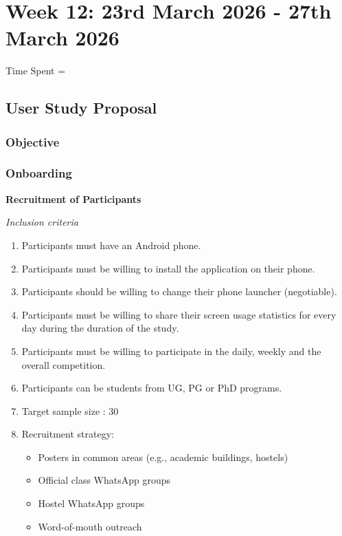 \documentclass{article}
\begin{document}
\newpage
\section{Week 12: 23rd March 2026 - 27th March 2026}
Time Spent =

\subsection{User Study Proposal}
\subsubsection{Objective}

\textbf{}

\subsubsection{Onboarding}

\textbf{Recruitment of Participants}

\textit{Inclusion criteria}
\begin{enumerate}
    \item Participants must have an Android phone.
    \item Participants must be willing to install the application on their phone.
    \item Participants should be willing to change their phone launcher (negotiable).
    \item Participants must be willing to share their screen usage statistics for every day during the duration of the study.
    \item Participants must be willing to participate in the daily, weekly and the overall competition.
    \item Participants can be students from UG, PG or PhD programs.
    \item Target sample size : 30
    \item Recruitment strategy:
    \begin{itemize}
        \item Posters in common areas (e.g., academic buildings, hostels)
        \item Official class WhatsApp groups
        \item Hostel WhatsApp groups
        \item Word-of-mouth outreach
    \end{itemize}
\end{enumerate}
\end{document}
